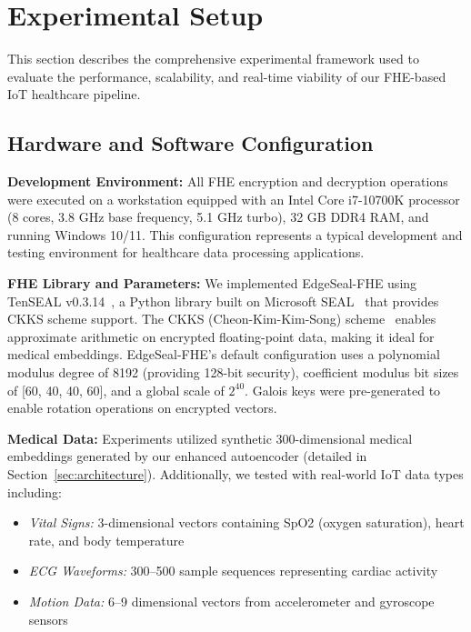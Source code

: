 
\section{Experimental Setup}
\label{sec:experimental-setup}

This section describes the comprehensive experimental framework used to evaluate the performance, scalability, and real-time viability of our FHE-based IoT healthcare pipeline.

\subsection{Hardware and Software Configuration}

\textbf{Development Environment:} All FHE encryption and decryption operations were executed on a workstation equipped with an Intel Core i7-10700K processor (8 cores, 3.8 GHz base frequency, 5.1 GHz turbo), 32 GB DDR4 RAM, and running Windows 10/11. This configuration represents a typical development and testing environment for healthcare data processing applications.

\textbf{FHE Library and Parameters:} We implemented EdgeSeal-FHE using TenSEAL v0.3.14~\cite{tenseal2021}, a Python library built on Microsoft SEAL~\cite{sealcrypto} that provides CKKS scheme support. The CKKS (Cheon-Kim-Kim-Song) scheme~\cite{cheon2017homomorphic} enables approximate arithmetic on encrypted floating-point data, making it ideal for medical embeddings. EdgeSeal-FHE's default configuration uses a polynomial modulus degree of 8192 (providing 128-bit security), coefficient modulus bit sizes of [60, 40, 40, 60], and a global scale of $2^{40}$. Galois keys were pre-generated to enable rotation operations on encrypted vectors.

\textbf{Medical Data:} Experiments utilized synthetic 300-dimensional medical embeddings generated by our enhanced autoencoder (detailed in Section~\ref{sec:architecture}). Additionally, we tested with real-world IoT data types including:
\begin{itemize}
    \item \textit{Vital Signs:} 3-dimensional vectors containing SpO2 (oxygen saturation), heart rate, and body temperature
    \item \textit{ECG Waveforms:} 300--500 sample sequences representing cardiac activity
    \item \textit{Motion Data:} 6--9 dimensional vectors from accelerometer and gyroscope sensors
\end{itemize}

